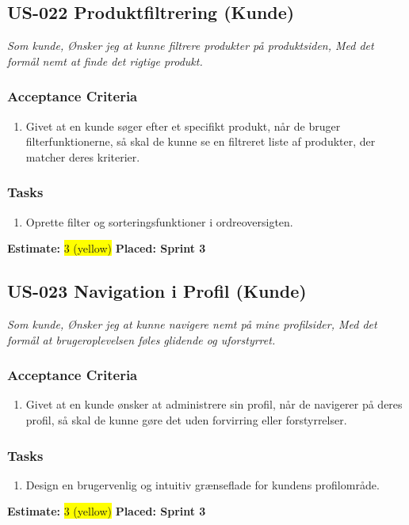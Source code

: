 \subsection{US-022 Produktfiltrering (Kunde)}
\label{sec:US-022}
\textit{Som kunde, Ønsker jeg at kunne filtrere produkter på produktsiden, Med det formål nemt at finde det rigtige produkt.}
\subsubsection*{\textbf{Acceptance Criteria}}
\begin{enumerate}
  \item Givet at en kunde søger efter et specifikt produkt, når de bruger filterfunktionerne, så skal de kunne se en filtreret liste af produkter, der matcher deres kriterier.
\end{enumerate}
\subsubsection*{\textbf{Tasks}}
\begin{enumerate}
  \item Oprette filter og sorteringsfunktioner i ordreoversigten.
\end{enumerate}
\textbf{Estimate:} \colorbox{yellow}{3 (yellow)}
\textbf{Placed: Sprint 3}
\par\noindent\dotfill

\subsection{US-023 Navigation i Profil (Kunde)}
\label{sec:US-023}
\textit{Som kunde, Ønsker jeg at kunne navigere nemt på mine profilsider, Med det formål at brugeroplevelsen føles glidende og uforstyrret.}
\subsubsection*{\textbf{Acceptance Criteria}}
\begin{enumerate}
  \item Givet at en kunde ønsker at administrere sin profil, når de navigerer på deres profil, så skal de kunne gøre det uden forvirring eller forstyrrelser.
\end{enumerate}
\subsubsection*{\textbf{Tasks}}
\begin{enumerate}
  \item Design en brugervenlig og intuitiv grænseflade for kundens profilområde.
\end{enumerate}
\textbf{Estimate:} \colorbox{yellow}{3 (yellow)}
\textbf{Placed: Sprint 3}
\par\noindent\dotfill

